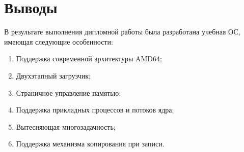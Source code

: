 \documentclass[12pt]{article}
\begin{document}
\section{\textbf{Выводы}}
В результате выполнения дипломной работы была разработана учебная ОС,
имеющая следующие особенности:

\begin{enumerate}
\item Поддержка современной архитектуры AMD64;
\item Двухэтапный загрузчик;
\item Страничное управление памятью;
\item Поддержка прикладных процессов и потоков ядра;
\item Вытесняющая многозадачность;
\item Поддержка механизма копирования при записи.
\end{enumerate}
\end{document}
